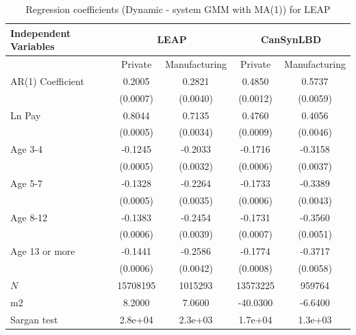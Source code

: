 \begin{table}[H]
  \centering
\begin{threeparttable}
 \caption{Regression coefficients (Dynamic - system GMM with MA(1)) for LEAP} \label{tab:Dynamic - system GMM with MA(1)_can} \medskip
\renewcommand{\arraystretch}{1}
\begin{tabular}{l|c c| c c}
\toprule
\textbf{Independent Variables}&\multicolumn{2}{c|}{\textbf{LEAP}} &  \multicolumn{2}{c}{\textbf{CanSynLBD}}\\
\midrule
&\multicolumn{1}{c}{Private}&\multicolumn{1}{c}{Manufacturing}&\multicolumn{1}{c}{Private}&\multicolumn{1}{c}{Manufacturing}\\
\hline
AR(1) Coefficient&   0.2005\sym{***}&   0.2821\sym{***}&   0.4850\sym{***}&   0.5737\sym{***}\\
          & (0.0007)         & (0.0040)         & (0.0012)         & (0.0059)         \\
[1em]
Ln Pay    &   0.8044\sym{***}&   0.7135\sym{***}&   0.4760\sym{***}&   0.4056\sym{***}\\
          & (0.0005)         & (0.0034)         & (0.0009)         & (0.0046)         \\
[1em]
Age 3-4   &  -0.1245\sym{***}&  -0.2033\sym{***}&  -0.1716\sym{***}&  -0.3158\sym{***}\\
          & (0.0005)         & (0.0032)         & (0.0006)         & (0.0037)         \\
[1em]
Age 5-7   &  -0.1328\sym{***}&  -0.2264\sym{***}&  -0.1733\sym{***}&  -0.3389\sym{***}\\
          & (0.0005)         & (0.0035)         & (0.0006)         & (0.0043)         \\
[1em]
Age 8-12  &  -0.1383\sym{***}&  -0.2454\sym{***}&  -0.1731\sym{***}&  -0.3560\sym{***}\\
          & (0.0006)         & (0.0039)         & (0.0007)         & (0.0051)         \\
[1em]
Age 13 or more&  -0.1441\sym{***}&  -0.2586\sym{***}&  -0.1774\sym{***}&  -0.3717\sym{***}\\
          & (0.0006)         & (0.0042)         & (0.0008)         & (0.0058)         \\
\hline
\(N\)     & 15708195         &  1015293         & 13573225         &   959764         \\
m2        &   8.2000         &   7.0600         & -40.0300         &  -6.6400         \\
Sargan test&  2.8e+04         &  2.3e+03         &  1.7e+04         &  1.3e+03         \\

\end{tabular}
\end{threeparttable}
\end{table}
